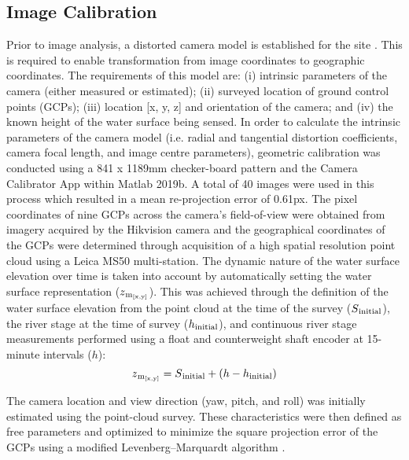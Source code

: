 \documentclass[hess, manuscript]{copernicus}
\begin{document}
\subsection{Image Calibration}\label{Image Calibration}
Prior to image analysis, a distorted camera model is established for the site \citep{Messerli2015, Perks2016}. This is required to enable transformation from image coordinates to geographic coordinates. The requirements of this model are: (i) intrinsic parameters of the camera (either measured or estimated); (ii) surveyed location of ground control points (GCPs); (iii) location [x, y, z] and orientation of the camera; and (iv) the known height of the water surface being sensed. In order to calculate the intrinsic parameters of the camera model (i.e. radial and tangential distortion coefficients, camera focal length, and image centre parameters), geometric calibration was conducted using a 841 x 1189mm checker-board pattern and the Camera Calibrator App within Matlab 2019b. A total of 40 images were used in this process which resulted in a mean re-projection error of 0.61px. The pixel coordinates of nine GCPs across the camera's field-of-view were obtained from imagery acquired by the Hikvision camera and the geographical coordinates of the GCPs were determined through acquisition of a high spatial resolution point cloud using a Leica MS50 multi-station. The dynamic nature of the water surface elevation over time is taken into account by automatically setting the water surface representation ($z\textsubscript{m\textsubscript{[x,y]}}$). This was achieved through the definition of the water surface elevation from the point cloud at the time of the survey ($S\textsubscript{initial}$), the river stage at the time of survey ($h\textsubscript{initial}$), and continuous river stage measurements performed using a float and counterweight shaft encoder at 15-minute intervals ($h$):
\begin{equation}
 z\textsubscript{m\textsubscript{[x,y]}} = S\textsubscript{initial} + (h - h\textsubscript{initial})
\label{eqn: Equation 1}
\end{equation}

The camera location and view direction (yaw, pitch, and roll) was initially estimated using the point-cloud survey. These characteristics were then defined as free parameters and optimized to minimize the square projection error of the GCPs using a modified Levenberg–Marquardt algorithm \citep{Fletcher1971}.
\end{document}

